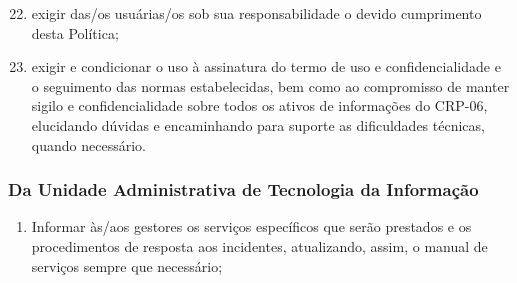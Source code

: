 \begin{enumerate}

\setcounter{enumi}{21}
\item
    exigir das/os usuárias/os sob sua responsabilidade o devido
    cumprimento desta Política;
\item
    exigir e condicionar o uso à assinatura do termo de uso e
    confidencialidade e o seguimento das normas estabelecidas, bem como ao
    compromisso de manter sigilo e confidencialidade sobre todos os ativos
    de informações do CRP-06, elucidando dúvidas e encaminhando para
    suporte as dificuldades técnicas, quando necessário.
\end{enumerate}

\subsubsection{Da Unidade Administrativa de Tecnologia da
Informação}

\begin{enumerate}

\item
    Informar às/aos gestores os serviços específicos que serão prestados e
    os procedimentos de resposta aos incidentes, atualizando, assim, o
    manual de serviços sempre que necessário;
\end{enumerate}

